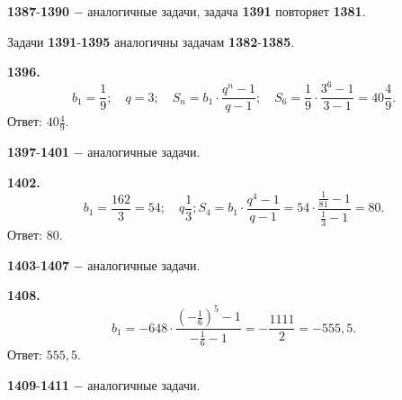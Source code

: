 \textbf{1387}-\textbf{1390} $-$ аналогичные задачи, задача \textbf{1391} повторяет \textbf{1381}.

Задачи \textbf{1391}-\textbf{1395} аналогичны задачам \textbf{1382}-\textbf{1385}.

\textbf{1396.} $$b_1=\frac{1}{9};\quad q=3;\quad S_n=b_1\cdot\frac{q^n-1}{q-1};\quad S_6=\frac{1}{9}\cdot\frac{3^6-1}{3-1}=40\frac{4}{9}.$$ \newline \null \hspace*{\fill} Ответ: $40\frac{4}{9}$. 

\textbf{1397}-\textbf{1401} $-$ аналогичные задачи.

\textbf{1402.} $$b_1=\frac{162}{3}=54;\quad q\frac{1}{3};S_4=b_1\cdot\frac{q^4-1}{q-1}=54\cdot\frac{\frac{1}{81}-1}{\frac{1}{3}-1}=80.$$ \newline \null \hspace*{\fill} Ответ: $80$.

\textbf{1403}-\textbf{1407} $-$ аналогичные задачи.

\textbf{1408.} $$b_1=-648\cdot\frac{\left(-\frac{1}{6}\right)^5-1}{-\frac{1}{6}-1}=-\frac{1111}{2}=-555,5.$$ \newline \null \hspace*{\fill} Ответ: $555,5$.

\textbf{1409}-\textbf{1411} $-$ аналогичные задачи.
